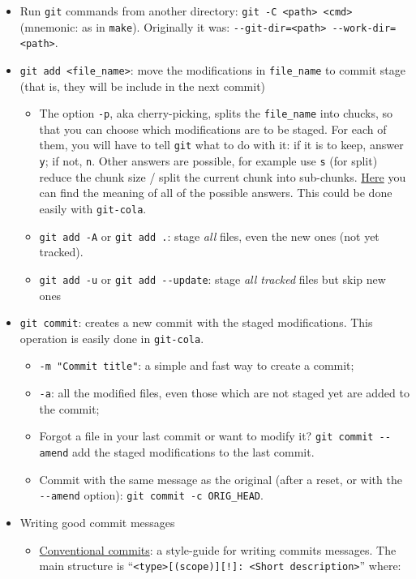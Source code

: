 \documentclass[a4paper,12pt,%
              final%
              ]{article}
\begin{document}
\begin{itemize}
  \item Run \verb|git| commands from another directory: \verb|git -C <path> <cmd>| (mnemonic: as in \verb|make|). Originally it was: \verb|--git-dir=<path> --work-dir=<path>|.
  \item \verb|git add <file_name>|: move the modifications in \verb|file_name| to commit stage (that is, they will be include in the next commit)
    \begin{itemize}
      \item The option \texttt{-p}, aka cherry-picking, splits the \verb|file_name| into chucks, so that you can choose which modifications are to be staged. For each of them, you will have to tell \texttt{git} what to do with it: if it is to keep, answer \texttt{y}; if not, \texttt{n}. Other answers are possible, for example use \texttt{s} (for split) reduce the chunk size / split the current chunk into sub-chunks. \href{https://stackoverflow.com/questions/1122210/can-i-modify-git-adds-hunk-size}{Here} you can find the meaning of all of the possible answers. This could be done easily with \texttt{git-cola}.
      \item \verb|git add -A| or \verb|git add .|: stage \emph{all} files, even the new ones (not yet tracked).
      \item \verb|git add -u| or \verb|git add --update|: stage \emph{all tracked} files but skip new ones
    \end{itemize}
  \item \texttt{git commit}: creates a new commit with the staged modifications. This operation is easily done in \texttt{git-cola}.
    \begin{itemize}
      \item \verb|-m "Commit title"|: a simple and fast way to create a commit;
      \item \texttt{-a}: all the modified files, even those which are not staged yet are added to the commit;
      \item Forgot a file in your last commit or want to modify it? \verb|git commit --amend| add the staged modifications to the last commit.
      \item Commit with the same message as the original (after a reset, or with the \verb|--amend| option): \verb|git commit -c ORIG_HEAD|.
    \end{itemize}
  \item Writing good commit messages
    \begin{itemize}
      \item \href{https://www.conventionalcommits.org/en/v1.0.0/}{Conventional commits}: a style-guide for writing commits messages. The main structure is ``\texttt{<type>[(scope)][!]: <Short description>}'' where:

\end{itemize}
\end{itemize}
\end{document}
